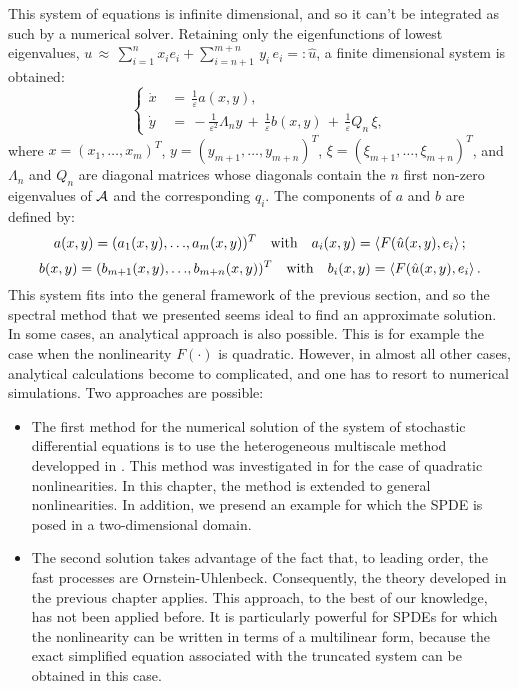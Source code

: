This system of equations is infinite dimensional, and so it can't be integrated as such by a numerical solver.
Retaining only the eigenfunctions of lowest eigenvalues, $u\,\approx\, \sum^{n}_{i=1}x_i e_i + \sum_{i=n+1}^{m+n} \,y_{i}\,e_{i} =: \hat u$, a finite dimensional system is obtained:
\begin{equation*}
    \left\{\begin{aligned} 
            \dot x\,&=\,\frac 1 {\varepsilon}a(x, y) ,\\ \dot
            y\,&=\,-\frac 1 {\varepsilon^{2}} \Lambda_{n}  y\,+\,\frac 1 {\varepsilon}
            b(x,y)\,+\,\frac 1 \varepsilon Q_n\,{\xi}, 
        \end{aligned} \right.  
\end{equation*} 
where $x = (x_1, \dots, x_m)^{T}$, $y = (y_{m+1}, \dots, y_{m + n})^{T}$, $\xi= (\xi_{m+1}, \dots, \xi_{m+n})^{T}$, and $\Lambda_{n}$ and $Q_{n}$ are diagonal matrices whose diagonals contain the $n$ first non-zero eigenvalues of $\mathcal A$ and the corresponding $q_{i}$.
The components of $a$ and $b$ are defined by: 
\begin{equation*} 
    a(x, y) = (a_{1}(x,y), {\dots},a_{m}(x,y))^{T} \quad \text{with} \quad a_{i}(x,y) = \left \langle F(\hat u(x,y),e_i \right\rangle;
\end{equation*} 
\begin{equation*} 
    b(x, y) = (b_{m+1}(x,y), {\dots},b_{m+n}(x,y))^{T} \quad \text{with} \quad b_{i}(x,y) = \left \langle F(\hat u(x,y),e_i \right\rangle.
\end{equation*} 
This system fits into the general framework of the previous section, and so the spectral method that we presented seems ideal to find an approximate solution.
In some cases, an analytical approach is also possible.
This is for example the case when the nonlinearity $F({\cdot})$ is quadratic.
However, in almost all other cases, analytical calculations become to complicated, and one has to resort to numerical simulations.
Two approaches are possible:
\begin{itemize} 
    \item The first method for the numerical solution of the system of stochastic differential equations is to use the heterogeneous multiscale method developped in \cite{weinan2005analysis}.
        This method was investigated in \cite{abdulle2012numerical} for the case of quadratic nonlinearities.
        In this chapter, the method is extended to general nonlinearities. In addition, we presend an example for which the SPDE is posed in a two-dimensional domain.
    \item The second solution takes advantage of the fact that, to leading order, the fast processes are Ornstein-Uhlenbeck.
        Consequently, the theory developed in the previous chapter applies.
        This approach, to the best of our knowledge, has not been applied before.
        It is particularly powerful for SPDEs for which the nonlinearity can be written in terms of a multilinear form, because the exact simplified equation associated with the truncated system can be obtained in this case. 
\end{itemize} 

